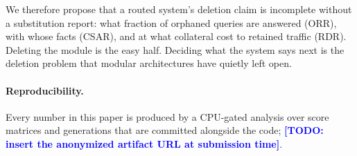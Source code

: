 \documentclass[11pt]{article}
\newcommand{\todonote}[1]{\textcolor{blue}{\textbf{[TODO: #1]}}}
\newcommand{\csar}{CSAR}
\newcommand{\orr}{ORR}
\newcommand{\rdr}{RDR}
\begin{document}
We therefore propose that a routed system's deletion claim is incomplete without a substitution
report: what fraction of orphaned queries are answered (\orr{}), with whose facts (\csar{}), and at
what collateral cost to retained traffic (\rdr{}). Deleting the module is the easy half. Deciding
what the system says next is the deletion problem that modular architectures have quietly left open.

\paragraph{Reproducibility.} Every number in this paper is produced by a CPU-gated analysis over
score matrices and generations that are committed alongside the code; \todonote{insert the
anonymized artifact URL at submission time}.



\end{document}
